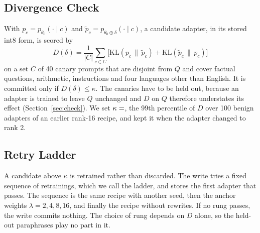 \documentclass[journal,10pt]{IEEEtran}
\begin{document}
\subsection{Divergence Check}
\label{sec:checkmethod}
With $p_c=p_{\theta_0}(\cdot\mid c)$ and $\tilde p_c=p_{\theta_0\oplus\delta}(\cdot\mid c)$, a candidate
adapter, in its stored int8 form, is scored by
\begin{equation}
D(\delta)=\frac{1}{|C|}\sum_{c\in C}\big[\mathrm{KL}(p_c\,\|\,\tilde p_c)
+\mathrm{KL}(\tilde p_c\,\|\,p_c)\big]
\end{equation}
on a set $C$ of 40 canary prompts that are disjoint from $Q$ and cover factual questions, arithmetic,
instructions and four languages other than English. It is committed only if $D(\delta)\le\kappa$. The canaries
have to be held out, because an adapter is trained to leave $Q$ unchanged and $D$ on $Q$ therefore
understates its effect (Section~\ref{sec:check}). We set
$\kappa=\N{69:pooled:benign_r16:kappa}$, the 99th percentile of $D$ over 100 benign adapters of an earlier
rank-16 recipe, and kept it when the adapter changed to rank 2.

\subsection{Retry Ladder}
\label{sec:ladder}
A candidate above $\kappa$ is retrained rather than discarded. The write tries a fixed sequence of
retrainings, which we call the ladder, and stores the first adapter that passes. The sequence is the same
recipe with another seed, then the anchor weights $\lambda=2,4,8,16$, and finally the recipe without
rewrites. If no rung passes, the write commits nothing. The choice of rung depends on $D$ alone, so the
held-out paraphrases play no part in it.
\end{document}
